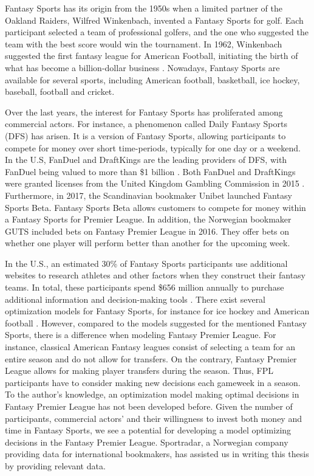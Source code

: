 Fantasy Sports has its origin from the 1950s when a limited partner of the Oakland Raiders, Wilfred Winkenbach, invented a Fantasy Sports for golf. Each participant selected a team of professional golfers, and the one who suggested the team with the best score would win the tournament. In 1962, Winkenbach suggested the first fantasy league for American Football, initiating the birth of what has become a billion-dollar business \citep{mccracken2012culturematic}. Nowadays, Fantasy Sports are available for several sports, including American football, basketball, ice hockey, baseball, football and cricket.  


\newpar

\newpage
Over the last years, the interest for Fantasy Sports has proliferated among commercial actors. For instance, a phenomenon called Daily Fantasy Sports (DFS) has arisen. It is a version of Fantasy Sports, allowing participants to compete for money over short time-periods, typically for one day or a weekend. In the U.S, FanDuel and DraftKings are the leading providers of DFS, with FanDuel being valued to more than \$1 billion \citep{forbes_fanduel}. Both FanDuel and DraftKings were granted licenses from the United Kingdom Gambling Commission in 2015 \citep{Purdum}. Furthermore, in 2017, the Scandinavian bookmaker Unibet launched Fantasy Sports Beta. Fantasy Sports Beta allows customers to compete for money within a Fantasy Sports for Premier League. In addition, the Norwegian bookmaker GUTS included bets on Fantasy Premier League in 2016. They offer bets on whether one player will perform better than another for the upcoming week.

\newpar

In the U.S., an estimated 30\% of Fantasy Sports participants use additional websites to research athletes and other factors when they construct their fantasy teams. In total, these participants spend \$656 million annually to purchase additional information and decision-making tools \citep{fantasy_decision_tools}. There exist several optimization models for Fantasy Sports, for instance for ice hockey \citep{drafting_hockey_pools} and American football \citep{Fry}. However, compared to the models suggested for the mentioned Fantasy Sports, there is a difference when modeling Fantasy Premier League. For instance, classical American Fantasy leagues consist of selecting a team for an entire season and do not allow for transfers. On the contrary, Fantasy Premier League allows for making player transfers during the season. Thus, FPL participants have to consider making new decisions each gameweek in a season. To the author's knowledge, an optimization model making optimal decisions in Fantasy Premier League has not been developed before. Given the number of participants, commercial actors' and their willingness to invest both money and time in Fantasy Sports, we see a potential for developing a model optimizing decisions in the Fantasy Premier League. Sportradar, a Norwegian company providing data for international bookmakers, has assisted us in writing this thesis by providing relevant data.

